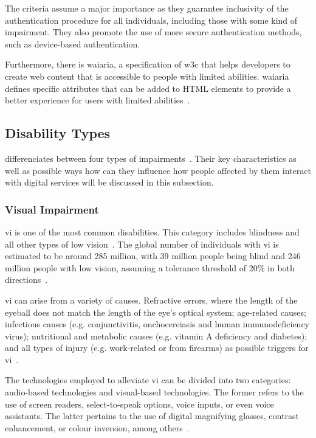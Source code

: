 \pspace{}The criteria assume a major importance as they guarantee inclusivity of the authentication procedure for all individuals, including those with some kind of impairment. They also promote the use of more secure authentication methods, such as device-based authentication.

Furthermore, there is \ac{waiaria}, a specification of \ac{w3c} that helps developers to create web content that is accessible to people with limited abilities. \Ac{waiaria} defines specific attributes that can be added to HTML elements to provide a better experience for users with limited abilities~\cite{waiaria_2017}.

\subsection{Disability Types}
\label{sec:understanding:disabilities}

\citeauthor{crow_2008} differenciates between four types of impairments~\cite{crow_2008}. Their key characteristics as well as possible ways how can they influence how people affected by them interact with digital services will be discussed in this subsection.

\subsubsection{Visual Impairment}
\label{sec:understanding:disabilities:vi}

\Ac{vi} is one of the most common disabilities. This category includes blindness and all other types of low vision~\cite{congdon_2003}. The global number of individuals with \ac{vi} is estimated to be around 285 million, with 39 million people being blind and 246 million people with low vision, assuming a tolerance threshold of 20\% in both directions~\cite{pascolini_2012}.

\Ac{vi} can arise from a variety of causes. Refractive errors, where the length of the eyeball does not match the length of the eye's optical system; age-related causes; infectious causes (e.g. conjunctivitis, onchocerciasis and human immunodeficiency virus); nutritional and metabolic causes (e.g. vitamin A deficiency and diabetes); and all types of injury (e.g. work-related or from firearms) as possible triggers for \ac{vi}~\cite{congdon_2003}.

The technologies employed to alleviate \ac{vi} can be divided into two categories: audio-based technologies and visual-based technologies. The former refers to the use of screen readers, select-to-speak options, voice inputs, or even voice assistants. The latter pertains to the use of digital magnifying glasses, contrast enhancement, or colour inversion, among others~\cite{senjam_2021}.


